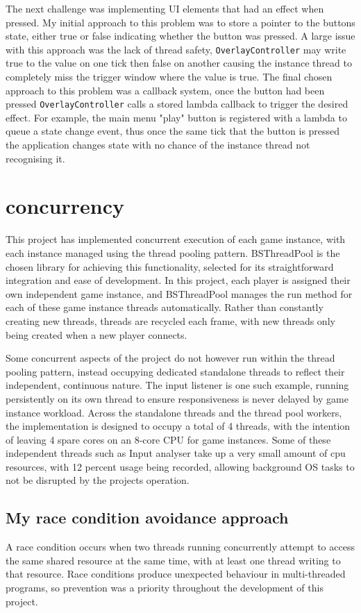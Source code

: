 \documentclass[]{final_report}
\begin{document}
The next challenge was implementing UI elements that had an effect when pressed. My initial approach to this problem was to store a pointer to the buttons state, either true or false indicating whether the button was pressed. A large issue with this approach was the lack of thread safety, \texttt{OverlayController} may write true to the value on one tick then false on another causing the instance thread to completely miss the trigger window where the value is true. The final chosen approach to this problem was a callback system, once the button had been pressed \texttt{OverlayController} calls a stored lambda callback to trigger the desired effect. For example, the main menu "play" button is registered with a lambda to queue a state change event, thus once the same tick that the button is pressed the application changes state with no chance of the instance thread not recognising it.

\section{concurrency}
This project has implemented concurrent execution of each game instance, with each instance managed using the thread pooling pattern. BSThreadPool is the chosen library for achieving this functionality, selected for its straightforward integration and ease of development. In this project, each player is assigned their own independent game instance, and BSThreadPool manages the run method for each of these game instance threads automatically. Rather than constantly creating new threads, threads are recycled each frame, with new threads only being created when a new player connects.  

Some concurrent aspects of the project do not however run within the thread pooling pattern, instead occupying dedicated standalone threads to reflect their independent, continuous nature. The input listener is one such example, running persistently on its own thread to ensure responsiveness is never delayed by game instance workload. Across the standalone threads and the thread pool workers, the implementation is designed to occupy a total of 4 threads, with the intention of leaving 4 spare cores on an 8-core CPU for game instances. Some of these independent threads such as Input analyser take up a very small amount of cpu resources, with 12 percent usage being recorded, allowing background OS tasks to not be disrupted by the projects operation.


\subsection{My race condition avoidance approach}
A race condition occurs when two threads running concurrently attempt to access 
the same shared resource at the same time, with at least one thread writing to 
that resource. Race conditions produce unexpected behaviour in multi-threaded 
programs, so prevention was a priority throughout the development of this project.
\end{document}
